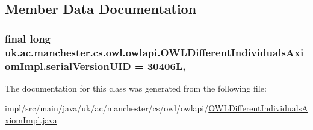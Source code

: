 \subsection{Member Data Documentation}
\hypertarget{classuk_1_1ac_1_1manchester_1_1cs_1_1owl_1_1owlapi_1_1_o_w_l_different_individuals_axiom_impl_a455fc24fbe24135cdbb56aac6f3a13e4}{
\subsubsection[{serial\-Version\-U\-I\-D}]{\setlength{\rightskip}{0pt plus 5cm}final long uk.\-ac.\-manchester.\-cs.\-owl.\-owlapi.\-O\-W\-L\-Different\-Individuals\-Axiom\-Impl.\-serial\-Version\-U\-I\-D = 30406\-L\hspace{0.3cm}{\ttfamily [static]}, {\ttfamily [private]}}}\label{classuk_1_1ac_1_1manchester_1_1cs_1_1owl_1_1owlapi_1_1_o_w_l_different_individuals_axiom_impl_a455fc24fbe24135cdbb56aac6f3a13e4}


The documentation for this class was generated from the following file\-:\begin{DoxyCompactItemize}
\item 
impl/src/main/java/uk/ac/manchester/cs/owl/owlapi/\hyperlink{_o_w_l_different_individuals_axiom_impl_8java}{O\-W\-L\-Different\-Individuals\-Axiom\-Impl.\-java}\end{DoxyCompactItemize}
